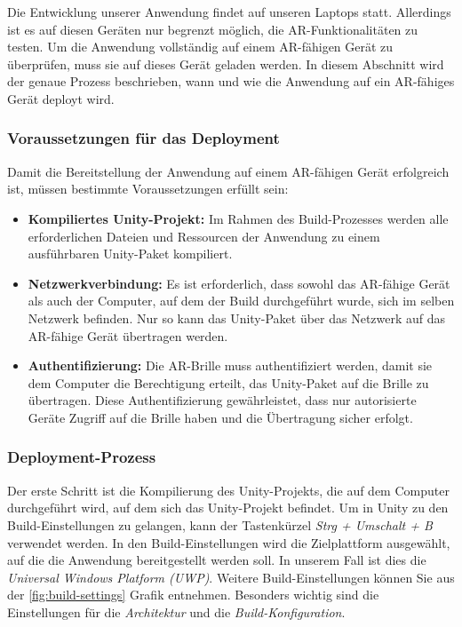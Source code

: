 Die Entwicklung unserer Anwendung findet auf unseren Laptops statt. Allerdings ist es auf diesen Geräten nur begrenzt
möglich, die AR-Funktionalitäten zu testen. Um die Anwendung vollständig auf einem AR-fähigen Gerät zu überprüfen, muss
sie auf dieses Gerät geladen werden. In diesem Abschnitt wird der genaue Prozess beschrieben, wann und wie die Anwendung
auf ein AR-fähiges Gerät deployt wird.

\subsubsection{Voraussetzungen für das Deployment}

Damit die Bereitstellung der Anwendung auf einem AR-fähigen Gerät erfolgreich ist, müssen bestimmte Voraussetzungen erfüllt sein:

\begin{itemize}
    \item \textbf{Kompiliertes Unity-Projekt:} Im Rahmen des Build-Prozesses werden alle erforderlichen Dateien und
    Ressourcen der Anwendung zu einem ausführbaren Unity-Paket kompiliert.

    \item \textbf{Netzwerkverbindung:} Es ist erforderlich, dass sowohl das AR-fähige Gerät als auch der Computer, auf
    dem der Build durchgeführt wurde, sich im selben Netzwerk befinden. Nur so kann das Unity-Paket über das Netzwerk
    auf das AR-fähige Gerät übertragen werden.

    \item \textbf{Authentifizierung:} Die AR-Brille muss authentifiziert werden, damit sie dem Computer die Berechtigung
    erteilt, das Unity-Paket auf die Brille zu übertragen. Diese Authentifizierung gewährleistet, dass nur autorisierte
    Geräte Zugriff auf die Brille haben und die Übertragung sicher erfolgt.

\end{itemize}

\subsubsection{Deployment-Prozess}


Der erste Schritt ist die Kompilierung des Unity-Projekts, die auf dem Computer durchgeführt wird, auf dem sich das
Unity-Projekt befindet. Um in Unity zu den Build-Einstellungen zu gelangen, kann der Tastenkürzel \textit{Strg + Umschalt + B}
verwendet werden. In den Build-Einstellungen wird die Zielplattform ausgewählt, auf die die Anwendung bereitgestellt
werden soll. In unserem Fall ist dies die \textit{Universal Windows Platform (UWP)}. Weitere Build-Einstellungen können
Sie aus der \ref{fig:build-settings} Grafik entnehmen. Besonders wichtig sind die Einstellungen für die \textit{Architektur} und
die \textit{Build-Konfiguration}.

